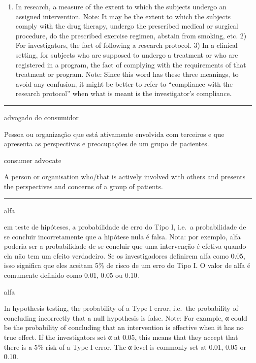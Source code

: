 \documentclass[
  openany]{book}
\providecommand{\tightlist}{%
  \setlength{\itemsep}{0pt}\setlength{\parskip}{0pt}}
\begin{document}
\begin{enumerate}
\def\labelenumi{\arabic{enumi})}
\tightlist
\item
  In research, a measure of the extent to which the subjects undergo an assigned intervention. Note: It may be the extent to which the subjects comply with the drug therapy, undergo the prescribed medical or surgical procedure, do the prescribed exercise regimen, abstain from smoking, etc. 2) For investigators, the fact of following a research protocol. 3) In a clinical setting, for subjects who are supposed to undergo a treatment or who are registered in a program, the fact of complying with the requirements of that treatment or program. Note: Since this word has these three meanings, to avoid any confusion, it might be better to refer to ``compliance with the research protocol'' when what is meant is the investigator's compliance.
\end{enumerate}

\begin{center}\rule{0.5\linewidth}{0.5pt}\end{center}

advogado do consumidor

Pessoa ou organização que está ativamente envolvida com terceiros e que apresenta as perspectivas e preocupações de um grupo de pacientes.

consumer advocate

A person or organisation who/that is actively involved with others and presents the perspectives and concerns of a group of patients.

\begin{center}\rule{0.5\linewidth}{0.5pt}\end{center}

alfa

em teste de hipóteses, a probabilidade de erro do Tipo I, i.e.~a probabilidade de se concluir incorretamente que a hipótese nula é falsa. Nota: por exemplo, alfa poderia ser a probabilidade de se concluir que uma intervenção é efetiva quando ela não tem um efeito verdadeiro. Se os investigadores definirem alfa como 0.05, isso significa que eles aceitam 5\% de risco de um erro do Tipo I. O valor de alfa é comumente definido como 0.01, 0.05 ou 0.10.

alfa

In hypothesis testing, the probability of a Type I error, i.e.~the probability of concluding incorrectly that a null hypothesis is false. Note: For example, α could be the probability of concluding that an intervention is effective when it has no true effect. If the investigators set α at 0.05, this means that they accept that there is a 5\% risk of a Type I error. The α-level is commonly set at 0.01, 0.05 or 0.10.
\end{document}
